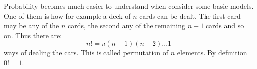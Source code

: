 Probability becomes much easier to understand when consider some basic models.
One of them is how for example a deck of $n$ cards can be dealt. The first card may be any of the $n$ cards, the second any of the remaining $n - 1$ cards and so on. Thus there are:
\[ n! = n(n - 1)(n - 2)...1 \]
ways of dealing the cars. This is called permutation of $n$ elements. By definition $0! = 1$.